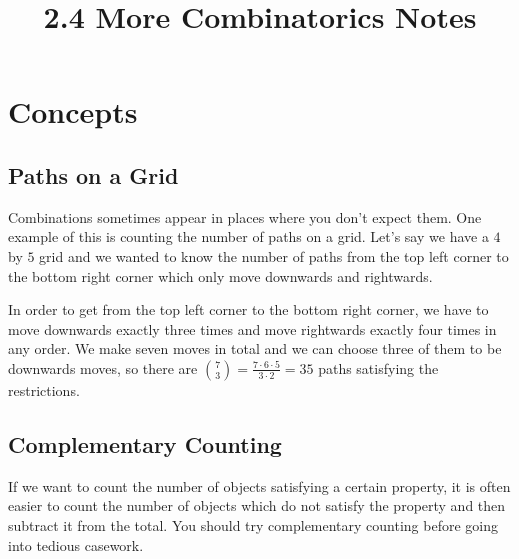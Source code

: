 \documentclass[twocolumn]{article}
\title{2.4 More Combinatorics Notes}
\author{}
\date{}
\begin{document}
\maketitle

\section*{Concepts}

\subsection*{Paths on a Grid}
Combinations sometimes appear in places where you don't expect them.
One example of this is counting the number of paths on a grid.
Let's say we have a $4$ by $5$ grid and we wanted to know the number of paths from the top left corner to the bottom right corner which only move downwards and rightwards.
\begin{center}
\end{center}In order to get from the top left corner to the bottom right corner, we have to move downwards exactly three times and move rightwards exactly four times in any order.
We make seven moves in total and we can choose three of them to be downwards moves, so there are $\binom{7}{3} = \frac{7 \cdot 6 \cdot 5}{3 \cdot 2} = 35$ paths satisfying the restrictions.

\subsection*{Complementary Counting}
If we want to count the number of objects satisfying a certain property, it is often easier to count the number of objects which do not satisfy the property and then subtract it from the total.
You should try complementary counting before going into tedious casework.
\end{document}
